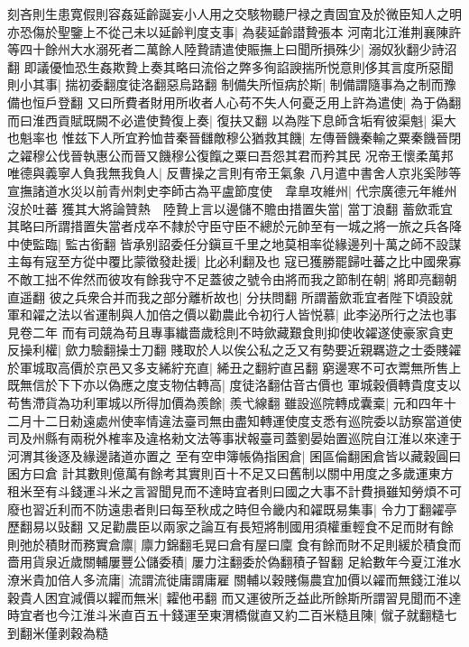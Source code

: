刻吝則生患寛假則容姦延齡誕妄小人用之交駭物聽尸禄之責固宜及於微臣知人之明亦恐傷於聖鑒上不從己未以延齡判度支事|{
	為裴延齡譛贄張本}
河南北江淮荆襄陳許等四十餘州大水溺死者二萬餘人陸贄請遣使賑撫上曰聞所損殊少|{
	溺奴狄翻少詩沼翻}
即議優恤恐生姦欺贄上奏其略曰流俗之弊多徇諂諛揣所悦意則侈其言度所惡聞則小其事|{
	揣初委翻度徒洛翻惡烏路翻}
制備失所恒病於斯|{
	制備謂隨事為之制而豫備也恒戶登翻}
又曰所費者財用所收者人心苟不失人何憂乏用上許為遣使|{
	為于偽翻}
而曰淮西貢賦既闕不必遣使贄復上奏|{
	復扶又翻}
以為陛下息師含垢宥彼渠魁|{
	渠大也魁率也}
惟兹下人所宜矜恤昔秦晉讎敵穆公猶救其饑|{
	左傳晉饑秦輸之粟秦饑晉閉之糴穆公伐晉執惠公而晉又饑穆公復餼之粟曰吾怨其君而矜其民}
况帝王懷柔萬邦唯德與義寧人負我無我負人|{
	反曹操之言則有帝王氣象}
八月遣中書舍人京兆奚陟等宣撫諸道水災以前青州刺史李師古為平盧節度使　韋臯攻維州|{
	代宗廣德元年維州沒於吐蕃}
獲其大將論贊熱　陸贄上言以邊儲不贍由措置失當|{
	當丁浪翻}
蓄歛乖宜其略曰所謂措置失當者戍卒不隸於守臣守臣不總於元帥至有一城之將一旅之兵各降中使監臨|{
	監古銜翻}
皆承别詔委任分鎭亘千里之地莫相率從緣邊列十萬之師不設謀主每有寇至方從中覆比蒙徵發赴援|{
	比必利翻及也}
寇已獲勝罷歸吐蕃之比中國衆寡不敵工拙不侔然而彼攻有餘我守不足蓋彼之號令由將而我之節制在朝|{
	將即亮翻朝直遥翻}
彼之兵衆合并而我之部分離析故也|{
	分扶問翻}
所謂蓄歛乖宜者陛下頃設就軍和糴之法以省運制與人加倍之價以勸農此令初行人皆悦慕|{
	此李泌所行之法也事見卷二年}
而有司競為苟且專事纎嗇歲稔則不時歛藏艱食則抑使收糴遂使豪家貪吏反操利權|{
	歛力驗翻操士刀翻}
賤取於人以俟公私之乏又有勢要近親羈遊之士委賤糴於軍城取高價於京邑又多支絺紵充直|{
	絺丑之翻紵直呂翻}
窮邊寒不可衣鬻無所售上既無信於下下亦以偽應之度支物估轉高|{
	度徒洛翻估音古價也}
軍城穀價轉貴度支以苟售滯貨為功利軍城以所得加價為羨餘|{
	羨弋線翻}
雖設巡院轉成囊槖|{
	元和四年十二月十二日勑遠處州使率情違法臺司無由盡知轉運使度支悉有巡院委以訪察當道使司及州縣有兩税外榷率及違格勑文法等事狀報臺司蓋劉晏始置巡院自江淮以來達于河渭其後逐及緣邊諸道亦置之}
至有空申簿帳偽指囷倉|{
	囷區倫翻囷倉皆以藏穀圓曰囷方曰倉}
計其數則億萬有餘考其實則百十不足又曰舊制以關中用度之多歲運東方租米至有斗錢運斗米之言習聞見而不達時宜者則曰國之大事不計費損雖知勞煩不可廢也習近利而不防遠患者則曰每至秋成之時但令畿内和糴既易集事|{
	令力丁翻糴亭歷翻易以䜴翻}
又足勸農臣以兩家之論互有長短將制國用須權重輕食不足而財有餘則弛於積財而務實倉廪|{
	廪力錦翻毛晃曰倉有屋曰廩}
食有餘而財不足則緩於積食而嗇用貨泉近歲關輔屢豐公儲委積|{
	屢力注翻委於偽翻積子智翻}
足給數年今夏江淮水潦米貴加倍人多流庸|{
	流謂流徙庸謂庸雇}
關輔以穀賤傷農宜加價以糴而無錢江淮以穀貴人困宜減價以糶而無米|{
	糶他弔翻}
而又運彼所乏益此所餘斯所謂習見聞而不達時宜者也今江淮斗米直百五十錢運至東渭橋僦直又約二百米糙且陳|{
	僦子就翻糙七到翻米僅剥穀為糙}
